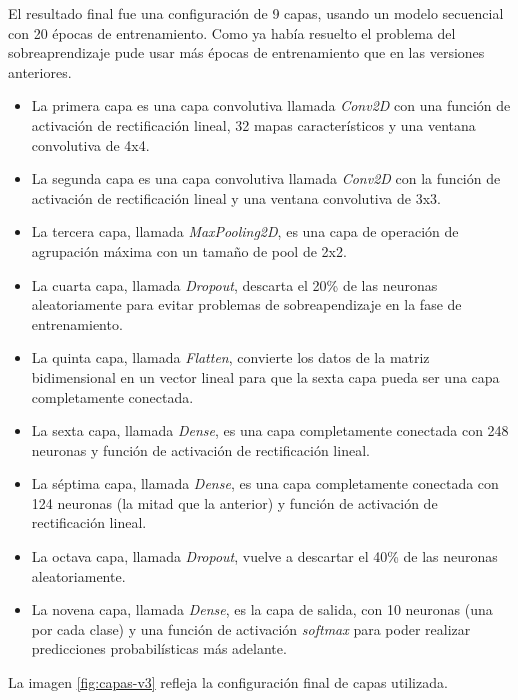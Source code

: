 \bigskip

El resultado final fue una configuración de 9 capas, usando un modelo secuencial con 20 épocas de entrenamiento. Como ya había resuelto el problema del sobreaprendizaje pude usar más épocas de entrenamiento que en las versiones anteriores.

\bigskip

\begin{itemize}
  \item La primera capa es una capa convolutiva llamada \textit{Conv2D} con una función de activación de rectificación lineal, 32 mapas característicos y una ventana convolutiva de 4x4.
  \item La segunda capa es una capa convolutiva llamada \textit{Conv2D} con la función de activación de rectificación lineal y una ventana convolutiva de 3x3.
  \item La tercera capa, llamada \textit{MaxPooling2D}, es una capa de operación de agrupación máxima con un tamaño de pool de 2x2.
  \item La cuarta capa, llamada \textit{Dropout}, descarta el 20\% de las neuronas aleatoriamente para evitar problemas de sobreapendizaje en la fase de entrenamiento.
  \item La quinta capa, llamada \textit{Flatten}, convierte los datos de la matriz bidimensional en un vector lineal para que la sexta capa pueda ser una capa completamente conectada.
  \item La sexta capa, llamada \textit{Dense}, es una capa completamente conectada con 248 neuronas y función de activación de rectificación lineal.
  \item La séptima capa, llamada \textit{Dense}, es una capa completamente conectada con 124 neuronas (la mitad que la anterior) y función de activación de rectificación lineal.
  \item La octava capa, llamada \textit{Dropout}, vuelve a descartar el 40\% de las neuronas aleatoriamente.
  \item La novena capa, llamada \textit{Dense}, es la capa de salida, con 10 neuronas (una por cada clase) y una función de activación \textit{softmax} para poder realizar predicciones probabilísticas más adelante.
\end{itemize}

\bigskip

La imagen  \ref{fig:capas-v3} refleja la configuración final de capas utilizada.

\bigskip

